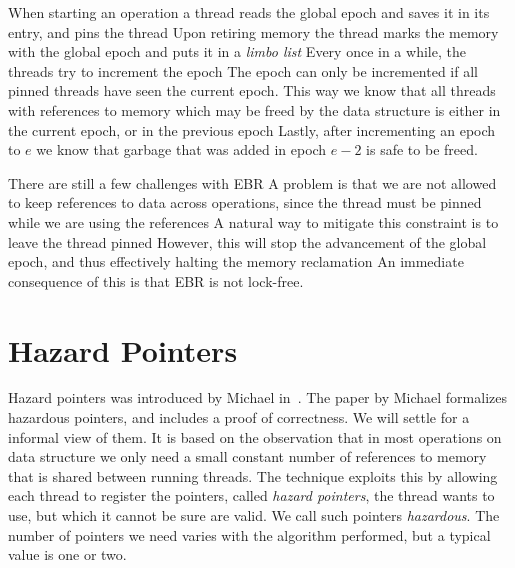 \documentclass[b5paper]{report}
\begin{document}
When starting an operation a thread reads the global epoch and saves it in its
entry, and pins the thread Upon retiring memory the thread marks the memory
with the global epoch and puts it in a \emph{limbo list}  Every once in a while, the threads try to
increment the epoch The epoch can only be incremented if all pinned threads
have seen the current epoch. This way we know that all threads with references
to memory which may be freed by the data structure is either in the current
epoch, or in the previous epoch Lastly, after incrementing an epoch to $e$ we
know that garbage that was added in epoch $e-2$ is safe to be freed.


There are still a few challenges with EBR A problem is that we are not
allowed to keep references to data across operations, since the thread must be
pinned while we are using the references A natural way to mitigate this
constraint is to leave the thread pinned However, this will stop the
advancement of the global epoch, and thus effectively halting the memory
reclamation An immediate consequence of this is that EBR is not lock-free.



\section{Hazard Pointers}

Hazard pointers was introduced by Michael in~\cite{michael2004hazard}.
The paper by Michael formalizes hazardous pointers, and includes a proof of
correctness. We will settle for a informal view of them. It is
based on the observation that in most operations on data structure we only need
a small constant number of references to memory that is shared between running
threads. The technique exploits this by allowing each thread to register the
pointers, called \emph{hazard pointers}, the thread wants to use, but which it
cannot be sure are valid. We call such pointers \emph{hazardous}. The number of
pointers we need varies with the algorithm performed, but a typical value is one
or two.
\end{document}
